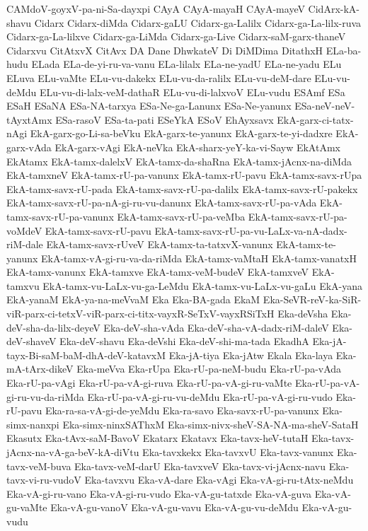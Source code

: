{CAMdoV-goyxV-pa-ni-Sa-dayxpi
CAyA
CAyA-mayaH
CAyA-mayeV
CidArx-kA-shavu
Cidarx
Cidarx-diMda
Cidarx-gaLU
Cidarx-ga-Lalilx
Cidarx-ga-La-lilx-ruva
Cidarx-ga-La-lilxve
Cidarx-ga-LiMda
Cidarx-ga-Live
Cidarx-saM-garx-thaneV
Cidarxvu
CitAtxvX
CitAvx
DA
Dane
DhwkateV
Di
DiMDima
DitathxH
ELa-ba-hudu
ELada
ELa-de-yi-ru-va-vanu
ELa-lilalx
ELa-ne-yadU
ELa-ne-yadu
ELu
ELuva
ELu-vaMte
ELu-vu-dakekx
ELu-vu-da-ralilx
ELu-vu-deM-dare
ELu-vu-deMdu
ELu-vu-di-lalx-veM-dathaR
ELu-vu-di-lalxvoV
ELu-vudu
ESAmf
ESa
ESaH
ESaNA
ESa-NA-tarxya
ESa-Ne-ga-Lanunx
ESa-Ne-yanunx
ESa-neV-neV-tAyxtAmx
ESa-rasoV
ESa-ta-pati
ESeYkA
ESoV
EhAyxsavx
EkA-garx-ci-tatx-nAgi
EkA-garx-go-Li-sa-beVku
EkA-garx-te-yanunx
EkA-garx-te-yi-dadxre
EkA-garx-vAda
EkA-garx-vAgi
EkA-neVka
EkA-sharx-yeY-ka-vi-Sayw
EkAtAmx
EkAtamx
EkA-tamx-dalelxV
EkA-tamx-da-shaRna
EkA-tamx-jAcnx-na-diMda
EkA-tamxneV
EkA-tamx-rU-pa-vanunx
EkA-tamx-rU-pavu
EkA-tamx-savx-rUpa
EkA-tamx-savx-rU-pada
EkA-tamx-savx-rU-pa-dalilx
EkA-tamx-savx-rU-pakekx
EkA-tamx-savx-rU-pa-nA-gi-ru-vu-danunx
EkA-tamx-savx-rU-pa-vAda
EkA-tamx-savx-rU-pa-vanunx
EkA-tamx-savx-rU-pa-veMba
EkA-tamx-savx-rU-pa-voMdeV
EkA-tamx-savx-rU-pavu
EkA-tamx-savx-rU-pa-vu-LaLx-va-nA-dadx-riM-dale
EkA-tamx-savx-rUveV
EkA-tamx-ta-tatxvX-vanunx
EkA-tamx-te-yanunx
EkA-tamx-vA-gi-ru-va-da-riMda
EkA-tamx-vaMtaH
EkA-tamx-vanatxH
EkA-tamx-vanunx
EkA-tamxve
EkA-tamx-veM-budeV
EkA-tamxveV
EkA-tamxvu
EkA-tamx-vu-LaLx-vu-ga-LeMdu
EkA-tamx-vu-LaLx-vu-gaLu
EkA-yana
EkA-yanaM
EkA-ya-na-meVvaM
Eka
Eka-BA-gada
EkaM
Eka-SeVR-reV-ka-SiR-viR-parx-ci-tetxV-viR-parx-ci-titx-vayxR-SeTxV-vayxRSiTxH
Eka-deVsha
Eka-deV-sha-da-lilx-deyeV
Eka-deV-sha-vAda
Eka-deV-sha-vA-dadx-riM-daleV
Eka-deV-shaveV
Eka-deV-shavu
Eka-deVshi
Eka-deV-shi-ma-tada
EkadhA
Eka-jA-tayx-Bi-saM-baM-dhA-deV-katavxM
Eka-jA-tiya
Eka-jAtw
Ekala
Eka-laya
Eka-mA-tArx-dikeV
Eka-meVva
Eka-rUpa
Eka-rU-pa-neM-budu
Eka-rU-pa-vAda
Eka-rU-pa-vAgi
Eka-rU-pa-vA-gi-ruva
Eka-rU-pa-vA-gi-ru-vaMte
Eka-rU-pa-vA-gi-ru-vu-da-riMda
Eka-rU-pa-vA-gi-ru-vu-deMdu
Eka-rU-pa-vA-gi-ru-vudo
Eka-rU-pavu
Eka-ra-sa-vA-gi-de-yeMdu
Eka-ra-savo
Eka-savx-rU-pa-vanunx
Eka-simx-nanxpi
Eka-simx-ninxSAThxM
Eka-simx-nivx-sheV-SA-NA-ma-sheV-SataH
Ekasutx
Eka-tAvx-saM-BavoV
Ekatarx
Ekatavx
Eka-tavx-heV-tutaH
Eka-tavx-jAcnx-na-vA-ga-beV-kA-diVtu
Eka-tavxkekx
Eka-tavxvU
Eka-tavx-vanunx
Eka-tavx-veM-buva
Eka-tavx-veM-darU
Eka-tavxveV
Eka-tavx-vi-jAcnx-navu
Eka-tavx-vi-ru-vudoV
Eka-tavxvu
Eka-vA-dare
Eka-vAgi
Eka-vA-gi-ru-tAtx-neMdu
Eka-vA-gi-ru-vano
Eka-vA-gi-ru-vudo
Eka-vA-gu-tatxde
Eka-vA-guva
Eka-vA-gu-vaMte
Eka-vA-gu-vanoV
Eka-vA-gu-vavu
Eka-vA-gu-vu-deMdu
Eka-vA-gu-vudu
}
